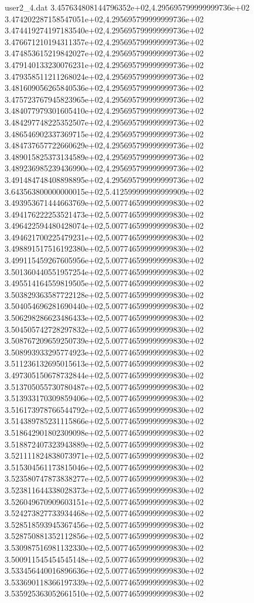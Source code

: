 \begin{filecontents}{user2_4.dat}
3.457634808144796352e+02,4.295695799999999736e+02
3.474202287158547051e+02,4.295695799999999736e+02
3.474419274197183540e+02,4.295695799999999736e+02
3.476671210194311357e+02,4.295695799999999736e+02
3.474853615219842027e+02,4.295695799999999736e+02
3.479140133230076231e+02,4.295695799999999736e+02
3.479358511211268024e+02,4.295695799999999736e+02
3.481609056265840536e+02,4.295695799999999736e+02
3.475723767945823965e+02,4.295695799999999736e+02
3.484077979301605410e+02,4.295695799999999736e+02
3.484297748225352507e+02,4.295695799999999736e+02
3.486546902337369715e+02,4.295695799999999736e+02
3.484737657722660629e+02,4.295695799999999736e+02
3.489015825373134589e+02,4.295695799999999736e+02
3.489236985239436990e+02,4.295695799999999736e+02
3.491484748408898895e+02,4.295695799999999736e+02
3.643563800000000015e+02,5.412599999999999909e+02
3.493953671444663769e+02,5.007746599999999830e+02
3.494176222253521473e+02,5.007746599999999830e+02
3.496422594480428074e+02,5.007746599999999830e+02
3.494621700225479231e+02,5.007746599999999830e+02
3.498891517516192380e+02,5.007746599999999830e+02
3.499115459267605956e+02,5.007746599999999830e+02
3.501360440551957254e+02,5.007746599999999830e+02
3.495514164559819505e+02,5.007746599999999830e+02
3.503829363587722128e+02,5.007746599999999830e+02
3.504054696281690440e+02,5.007746599999999830e+02
3.506298286623486433e+02,5.007746599999999830e+02
3.504505742728297832e+02,5.007746599999999830e+02
3.508767209659250739e+02,5.007746599999999830e+02
3.508993933295774923e+02,5.007746599999999830e+02
3.511236132695015613e+02,5.007746599999999830e+02
3.497305150678732844e+02,5.007746599999999830e+02
3.513705055730780487e+02,5.007746599999999830e+02
3.513933170309859406e+02,5.007746599999999830e+02
3.516173978766544792e+02,5.007746599999999830e+02
3.514389785231115866e+02,5.007746599999999830e+02
3.518642901802309098e+02,5.007746599999999830e+02
3.518872407323943889e+02,5.007746599999999830e+02
3.521111824838073971e+02,5.007746599999999830e+02
3.515304561173815046e+02,5.007746599999999830e+02
3.523580747873838277e+02,5.007746599999999830e+02
3.523811644338028373e+02,5.007746599999999830e+02
3.526049670909603151e+02,5.007746599999999830e+02
3.524273827733934468e+02,5.007746599999999830e+02
3.528518593945367456e+02,5.007746599999999830e+02
3.528750881352112856e+02,5.007746599999999830e+02
3.530987516981132330e+02,5.007746599999999830e+02
3.500911545454545148e+02,5.007746599999999830e+02
3.533456440016896636e+02,5.007746599999999830e+02
3.533690118366197339e+02,5.007746599999999830e+02
3.535925363052661510e+02,5.007746599999999830e+02

\end{filecontents}
